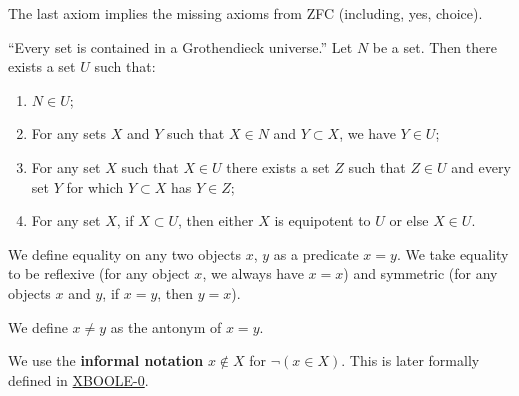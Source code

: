 \documentclass{article}
\begin{document}
\noindent The last axiom implies the missing axioms from ZFC (including, yes, choice).

\begin{axiom}[Universe]
``Every set is contained in a Grothendieck universe.''
  Let $N$ be a set. Then there exists a set $U$ such that:
  \begin{enumerate}
  \item $N\in U$;
  \item For any sets $X$ and $Y$ such that $X\in N$ and $Y\subset X$,
    we have $Y\in U$;
  \item For any set $X$ such that $X\in U$ there exists a set $Z$ such that $Z\in U$ and
    every set $Y$ for which $Y\subset X$ has $Y\in Z$;
  \item For any set $X$, if $X\subset U$, then either $X$ is equipotent
    to $U$ or else $X\in U$.
  \end{enumerate}
\end{axiom}

\begin{definition}
  We define equality on any two objects $x$, $y$ as a predicate $x=y$.
  We take equality to be reflexive (for any object $x$, we always have $x=x$)
and symmetric (for any objects $x$ and $y$, if $x=y$, then $y=x$).

We define $x\neq y$ as the antonym of $x=y$.
\end{definition}

\begin{notation}
We use the \textbf{informal notation} $x\notin X$ for $\neg(x\in X)$. This is
later formally defined in \hyperlink{notation:xboole0:nin}{XBOOLE-0}.
\end{notation}
\end{document}
